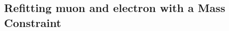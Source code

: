 \subsection{Refitting muon and electron \pt with a \texorpdfstring{\Zone}{Z1} Mass Constraint}  %
\label{sec:Z1constraint}

